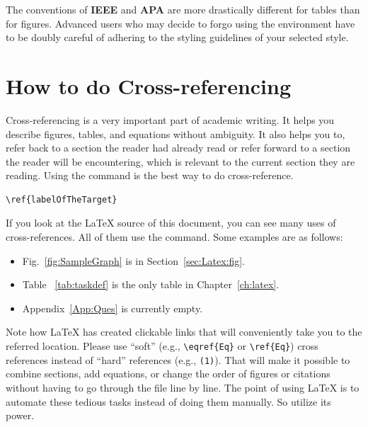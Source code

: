 \documentclass[12pt]{uomthesis}
\begin{document}
The conventions of \textbf{IEEE} and \textbf{APA} are more drastically different for tables than for figures. Advanced users who may decide to forgo using the  environment have to be doubly careful of adhering to the styling guidelines of your selected style.




\section{How to do Cross-referencing}
\label{sec:latex:cross}

Cross-referencing is a very important part of academic writing. It helps you describe figures, tables, and equations without ambiguity. It also helps you to, refer back to a section the reader had already read or refer forward to a section the reader will be encountering, which is relevant to the current section they are reading. Using the  command is the best way to do cross-reference. 

\begin{indentedQuote}
\begin{verbatim}
\ref{labelOfTheTarget}
\end{verbatim}
\end{indentedQuote}

If you look at the \LaTeX{} source of this document, you can see many uses of cross-references. All of them use the  command. Some examples are as follows:

\begin{itemize}
    \item Fig.~\ref{fig:SampleGraph} is in Section~\ref{sec:Latex:fig}.
    \item Table ~\ref{tab:taskdef} is the only table in Chapter~\ref{ch:latex}.
    \item Appendix~\ref{App:Ques} is currently empty.
\end{itemize}

Note how \LaTeX{} has created clickable links that will conveniently take you to the referred location. 
%
Please use ``soft'' (e.g., \verb|\eqref{Eq}| or \verb|\ref{Eq}|) cross references instead of ``hard'' references (e.g., \verb|(1)|). That will make it possible to combine sections, add equations, or change the order of figures or citations without having to go through the file line by line. The point of using \LaTeX{} is to automate these tedious tasks instead of doing them manually. So utilize its power. 
\end{document}
